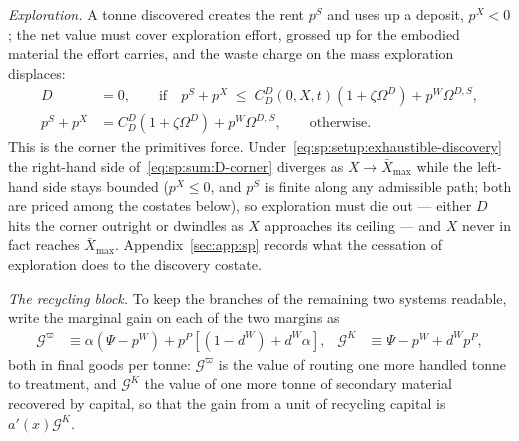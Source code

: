 \emph{Exploration.} A tonne discovered creates the rent $p^S$ and uses up a deposit, $p^X<0$; the
net value must cover exploration effort, grossed up for the embodied material the effort carries,
and the waste charge on the mass exploration displaces:
\begin{subequations}
\label{eq:sp:sum:Dsys}
\begin{align}
D &= 0,
\qquad \text{if}\quad
p^S+p^X \;\le\; C^D_D\left(0,X,t\right)\left(1+\zeta\Omega^D\right)+p^W\Omega^{D,S},
\label{eq:sp:sum:D-corner}
\\
p^S+p^X &= C^D_D\left(1+\zeta\Omega^D\right)+p^W\Omega^{D,S},
\qquad \text{otherwise.}
\label{eq:sp:sum:D}
\end{align}
\end{subequations}
This is the corner the primitives force. Under~\eqref{eq:sp:setup:exhaustible-discovery} the
right-hand side of~\eqref{eq:sp:sum:D-corner} diverges as $X\to\bar X_{\max}$ while the left-hand
side stays bounded ($p^X\le0$, and $p^S$ is finite along any admissible path; both are priced among
the costates below), so exploration must die out --- either $D$ hits the corner outright or dwindles
as $X$ approaches its ceiling --- and $X$ never in fact reaches $\bar X_{\max}$.
Appendix~\ref{sec:app:sp} records what the cessation of exploration does to the discovery costate.

\emph{The recycling block.} To keep the branches of the remaining two systems readable, write the
marginal gain on each of the two margins as
\begin{align}
\mathcal G^{\varpi} &\equiv \alpha\left(\Psi-p^W\right)+p^P\left[\left(1-d^W\right)+d^W\alpha\right],
&
\mathcal G^{K} &\equiv \Psi-p^W+d^Wp^P,
\label{eq:sp:sum:gains}
\end{align}
both in final goods per tonne: $\mathcal G^\varpi$ is the value of routing one more handled tonne to
treatment, and $\mathcal G^{K}$ the value of one more tonne of secondary material recovered by
capital, so that the gain from a unit of recycling capital is $a'\!\left(x\right)\mathcal G^K$.

